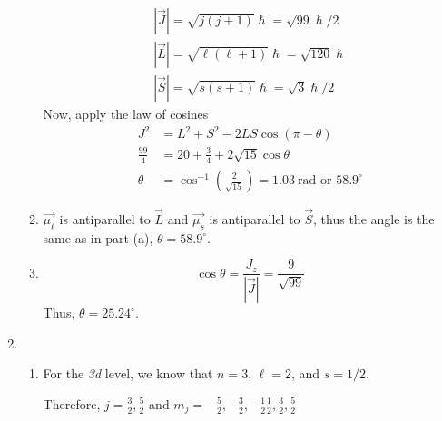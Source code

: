 \documentclass[10pt]{article}
\begin{document}
\begin{enumerate}
\begin{enumerate}
\begin{gather*}
    |\vec{J}| = \sqrt{j(j+1)}\hslash = \sqrt{99} \hslash / 2 \\
    |\vec{L}| = \sqrt{\ell(\ell+1)}\hslash = \sqrt{120} \hslash\\
    |\vec{S}| = \sqrt{s(s+1)}\hslash = \sqrt{3} \hslash / 2
  \end{gather*}
  Now, apply the law of cosines
  \begin{align*}
    J^2 &= L^2+S^2 - 2 L S \cos (\pi - \theta) \\
    \frac{99}{4} &= 20+\frac{3}{4} + 2 \sqrt{15} \cos \theta \\
    \theta &= \cos ^{-1} \left( \frac{2}{\sqrt{15}} \right) = 1.03~\text{rad}\text{ or }58.9^\circ
  \end{align*}
  \item 
    $ \vec{\mu_{\ell}} $ is antiparallel to $ \vec{L} $ and $ \vec{\mu_{s}} $ is antiparallel to $ \vec{S} $, thus the angle is the same as in part (a), $ \theta = 58.9^\circ $.
  \item 
    \begin{equation*}
      \cos \theta = \frac{J_z}{|\vec{J}|} = \frac{9}{\sqrt{99}}
    \end{equation*}
    Thus, $ \theta = 25.24^\circ $.
  \end{enumerate}
\item 
  \begin{enumerate}
  \item 
    For the \textit{3d} level, we know that $ n=3 $, $ \ell = 2 $, and $ s=1 / 2 $.
    
    Therefore, $ j = \frac{3}{2}, \frac{5}{2} $ and $ m_j = -\frac{5}{2}, -\frac{3}{2}, -\frac{1}{2} \frac{1}{2}, \frac{3}{2}, \frac{5}{2} $


\end{enumerate}
\end{enumerate}
\end{document}
